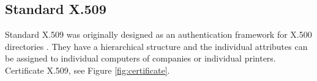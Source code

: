 \documentclass[
  digital, %
  notable,   %
  lof,     %
  lot,     %
]{fithesis3}
\begin{document}
\subsection{Standard X.509}
Standard X.509 was originally designed as an authentication framework for X.500 
directories \cite{schmeh2006cryptography}. They have a hierarchical structure and the 
individual attributes can be assigned to individual computers of companies or individual 
printers. %
Certificate X.509, see Figure \ref{fig:certificate}.

\end{document}
